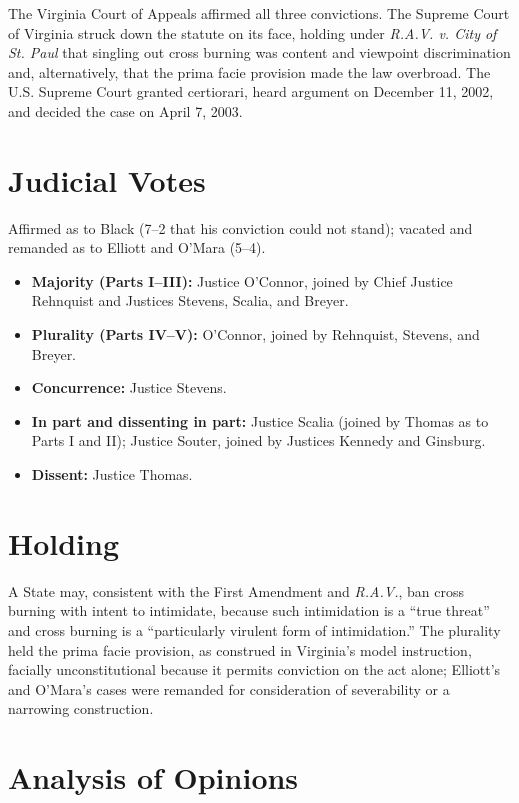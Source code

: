 \documentclass[12pt]{article}
\begin{document}
The Virginia Court of Appeals affirmed all three convictions. The Supreme Court of Virginia struck down the statute on its face, holding under \textit{R.A.V. v. City of St. Paul} that singling out cross burning was content and viewpoint discrimination and, alternatively, that the prima facie provision made the law overbroad. The U.S. Supreme Court granted certiorari, heard argument on December 11, 2002, and decided the case on April 7, 2003.

\section{Judicial Votes}

Affirmed as to Black (7--2 that his conviction could not stand); vacated and remanded as to Elliott and O'Mara (5--4).
\begin{itemize}
\item \textbf{Majority (Parts I--III):} Justice O'Connor, joined by Chief Justice Rehnquist and Justices Stevens, Scalia, and Breyer.
\item \textbf{Plurality (Parts IV--V):} O'Connor, joined by Rehnquist, Stevens, and Breyer.
\item \textbf{Concurrence:} Justice Stevens.
\item \textbf{In part and dissenting in part:} Justice Scalia (joined by Thomas as to Parts I and II); Justice Souter, joined by Justices Kennedy and Ginsburg.
\item \textbf{Dissent:} Justice Thomas.
\end{itemize}

\section{Holding}

A State may, consistent with the First Amendment and \textit{R.A.V.}, ban cross burning with intent to intimidate, because such intimidation is a ``true threat'' and cross burning is a ``particularly virulent form of intimidation.'' The plurality held the prima facie provision, as construed in Virginia's model instruction, facially unconstitutional because it permits conviction on the act alone; Elliott's and O'Mara's cases were remanded for consideration of severability or a narrowing construction.

\section{Analysis of Opinions}
\end{document}
